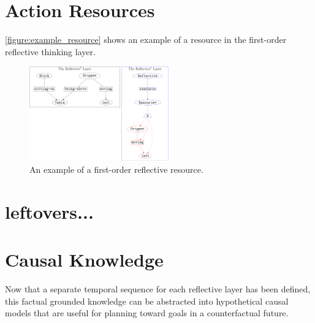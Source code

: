 \section{Action Resources}

{\mbox{\autoref{figure:example_resource}}} shows an example of a
resource in the first-order reflective thinking layer.
\begin{figure}
\center
\includegraphics[width=6cm]{gfx/example_resource}
\caption{An example of a first-order reflective resource.}
\label{figure:example_resource}
\end{figure}




\section{leftovers...}

\section{Causal Knowledge}

Now that a separate temporal sequence for each reflective layer has
been defined, this factual grounded knowledge can be abstracted into
hypothetical causal models that are useful for planning toward goals
in a counterfactual future.



